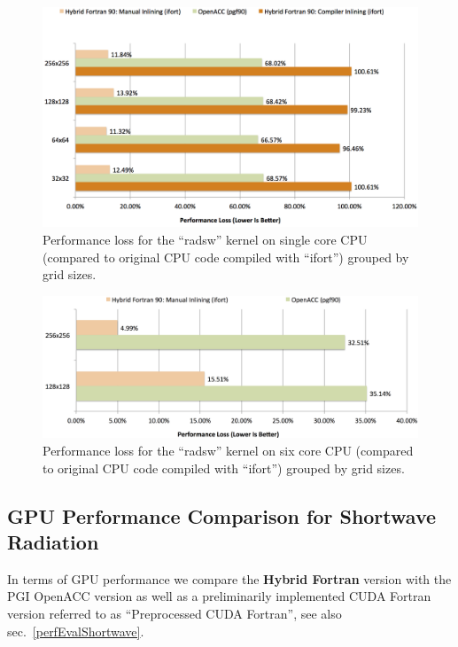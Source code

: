 \begin{figure}[htpb]
        \centering
        \includegraphics[width=14cm]{figures/verificationLossVS1Core}
        \caption[CPU Single Core Performance Loss of Sample Implementation]{Performance loss for the ``radsw'' kernel on single core CPU (compared to original CPU code compiled with ``ifort'') grouped by grid sizes.}
        \label{figure:verificationLossVS1Core}
\end{figure}

\begin{figure}[htpb]
        \centering
        \includegraphics[width=14cm]{figures/verificationLossVS6Core}
        \caption[CPU Six Core Performance Loss of Sample Implementation]{Performance loss for the ``radsw'' kernel on six core CPU (compared to original CPU code compiled with ``ifort'') grouped by grid sizes.}
        \label{figure:verificationLossVS6Core}
\end{figure}

\clearpage
\subsection{GPU Performance Comparison for Shortwave Radiation} \label{sub:performanceGPUValidation}

In terms of GPU performance we compare the \textbf{Hybrid Fortran} version with the PGI OpenACC version as well as a preliminarily implemented CUDA Fortran version referred to as \textquotedblleft Preprocessed CUDA Fortran\textquotedblright, see also sec.~\ref{perfEvalShortwave}.

